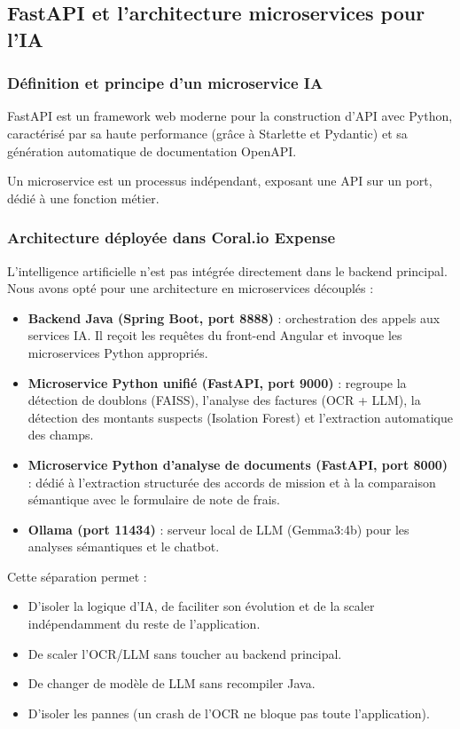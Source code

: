 \documentclass[12pt,a4paper]{report}
\begin{document}
\subsection{FastAPI et l'architecture microservices pour l'IA}

\subsubsection{Définition et principe d’un microservice IA}

FastAPI est un framework web moderne pour la construction d’API avec Python, caractérisé par sa haute performance (grâce à Starlette et Pydantic) et sa génération automatique de documentation OpenAPI.

Un microservice est un processus indépendant, exposant une API sur un port, dédié à une fonction métier.

\subsubsection{Architecture déployée dans Coral.io Expense}

L’intelligence artificielle n’est pas intégrée directement dans le backend principal. Nous avons opté pour une architecture en microservices découplés :

\begin{itemize}
 \item \textbf{Backend Java (Spring Boot, port 8888)} : orchestration des appels aux services IA. Il reçoit les requêtes du front-end Angular et invoque les microservices Python appropriés.
 \item \textbf{Microservice Python unifié (FastAPI, port 9000)} : regroupe la détection de doublons (FAISS), l’analyse des factures (OCR + LLM), la détection des montants suspects (Isolation Forest) et l’extraction automatique des champs.
 \item \textbf{Microservice Python d’analyse de documents (FastAPI, port 8000)} : dédié à l’extraction structurée des accords de mission et à la comparaison sémantique avec le formulaire de note de frais.
 \item \textbf{Ollama (port 11434)} : serveur local de LLM (Gemma3:4b) pour les analyses sémantiques et le chatbot.
\end{itemize}

Cette séparation permet :
\begin{itemize}
 \item D’isoler la logique d’IA, de faciliter son évolution et de la scaler indépendamment du reste de l’application.
 \item De scaler l’OCR/LLM sans toucher au backend principal.
 \item De changer de modèle de LLM sans recompiler Java.
 \item D’isoler les pannes (un crash de l’OCR ne bloque pas toute l’application).
\end{itemize}
\end{document}
